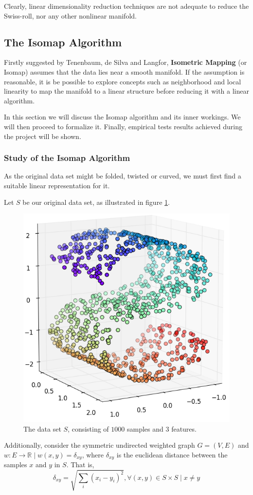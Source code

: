 \documentclass[12pt]{article}
\begin{document}
Clearly, linear dimensionality reduction techniques are not adequate to reduce the Swiss-roll, nor any other nonlinear manifold.

\subsection{The Isomap Algorithm}

Firstly suggested by Tenenbaum, de Silva and Langfor, \textbf{Isometric Mapping} (or Isomap) assumes that the data lies near a smooth manifold. If the assumption is reasonable, it is be possible to explore concepts such as neighborhood and local linearity to map the manifold to a linear structure before reducing it with a linear algorithm.

In this section we will discuss the Isomap algorithm and its inner workings. We will then proceed to formalize it. Finally, empirical tests results achieved during the project will be shown.

\subsubsection{Study of the Isomap Algorithm}

As the original data set might be folded, twisted or curved, \cite{ten2000} we must first find a suitable linear representation for it.

Let $S$ be our original data set, as illustrated in figure \ref{fig:mani_s}.

\begin{figure}[H]
	\centering
	\captionsetup{justification=centering}
	\includegraphics[width=.5\linewidth]{mani_s}
	\caption{The data set $S$, consisting of $1000$ samples and $3$ features.}
	\label{fig:mani_s}
\end{figure}

Additionally, consider the symmetric undirected weighted graph $G=(V, E)$ and $w \colon E \to \mathbb{R} \mid w(x, y) = \delta_{xy}$, where $\delta_{xy}$ is the euclidean distance between the samples $x$ and $y$ in $S$. That is,
$$\delta_{xy} = \sqrt{\sum_{i} (x_i - y_i)^2}, \forall (x, y) \in S\times S \mid x\ne y$$
\end{document}
